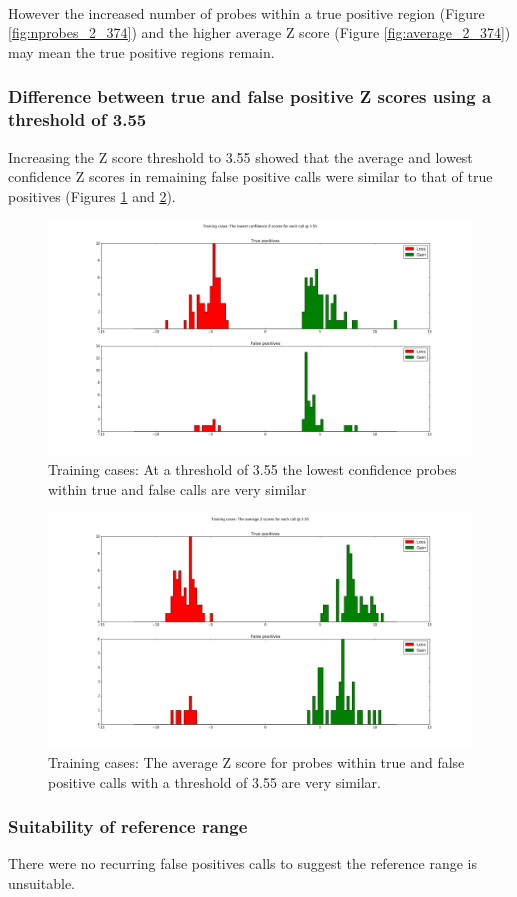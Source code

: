 \paragraph*{}
However the increased number of probes within a true positive region (Figure \ref{fig:nprobes_2_374}) and the higher average Z score (Figure \ref{fig:average_2_374}) may mean the true positive regions remain.

\subsubsection{Difference between true and false positive Z scores using a threshold of 3.55}
Increasing the Z score threshold to 3.55 showed that the average and lowest confidence Z scores in remaining false positive calls were similar to that of true positives (Figures \ref{fig:lowest_3_55} and \ref{fig:average_3_55}).

\begin{figure}[h]
\centering
\includegraphics[width=1\linewidth]{./Figures/lowest_3_55}
\caption[Training cases: The lowest confidence probe within calls at a threshold of 3.55]{Training cases: At a threshold of 3.55 the lowest confidence probes within true and false calls are very similar}
\label{fig:lowest_3_55}
\end{figure}

\begin{figure}[h]
\centering
\includegraphics[width=1\linewidth]{./Figures/average_3_55}
\caption[Training cases:Average Z scores for calls made with a threshold of 3.55]{Training cases: The average Z score for probes within true and false positive calls with a threshold of 3.55 are very similar.}
\label{fig:average_3_55}
\end{figure}

\subsubsection{Suitability of reference range}
There were no recurring false positives calls to suggest the reference range is unsuitable.